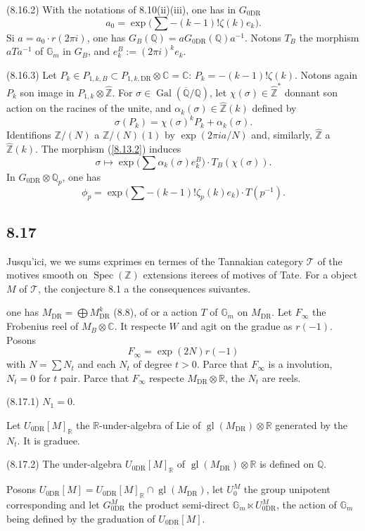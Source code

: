 \documentclass[12pt,a4paper]{article}
\theoremstyle{plain}
\theoremstyle{definition}
\theoremstyle{remark}
\DeclareMathOperator{\Spec}{Spec}
\DeclareMathOperator{\Gal}{Gal}
\DeclareMathOperator{\gl}{gl}
\newcommand{\Gm}{\mathbb{G}_m}
\newcommand{\Q}{\mathbb{Q}}
\newcommand{\Z}{\mathbb{Z}}
\newcommand{\C}{\mathbb{C}}
\newcommand{\R}{\mathbb{R}}
\newcommand{\DR}{\mathrm{DR}}
\begin{document}
(8.16.2) With the notations of 8.10(ii)(iii), one has in $G_{0\DR}$
$$a_0 = \exp\Big(\sum -(k-1)!\zeta(k) e_k\Big).$$
Si $a = a_0 \cdot r(2\pi i)$, one has $G_B(\Q) = a G_{0\DR}(\Q) a^{-1}$. Notons $T_B$ the morphism $aTa^{-1}$ of $\Gm$ in $G_B$, and $e_k^B := (2\pi i)^k e_k$.

(8.16.3) Let $P_k \in P_{1,k,B} \subset P_{1,k,\DR} \otimes \C = \C$: $P_k = -(k-1)!\zeta(k)$. Notons again $P_k$ son image in $P_{1,k} \otimes \hat{\Z}$. For $\sigma \in \Gal(\overline{\Q}/\Q)$, let $\chi(\sigma) \in \hat{\Z}^*$ donnant son action on the racines of the unite, and $\alpha_k(\sigma) \in \hat{\Z}(k)$ defined by
$$\sigma(P_k) = \chi(\sigma)^k P_k + \alpha_k(\sigma).$$
Identifions $\Z/(N)$ a $\Z/(N)(1)$ by $\exp(2\pi i a/N)$ and, similarly, $\hat{\Z}$ a $\hat{\Z}(k)$. The morphism (\ref{8.13.2}) induces
\begin{equation}\label{8.16.4}
\sigma \longmapsto \exp\Big(\sum \alpha_k(\sigma) e_k^B\Big) \cdot T_B(\chi(\sigma)). \tag{8.16.4}
\end{equation}
In $G_{0\DR} \otimes \Q_p$, one has
$$\phi_p = \exp\Big(\sum -(k-1)!\zeta_p(k) e_k\Big) \cdot T(p^{-1}).$$

\subsection*{8.17}

Jusqu'ici, we we sums exprimes en termes of the Tannakian category $\mathcal{T}$ of the motives smooth on $\Spec(\Z)$ extensions iterees of motives of Tate. For a object $M$ of $\mathcal{T}$, the conjecture 8.1 a the consequences suivantes.

one has $M_{\DR} = \bigoplus M_{\DR}^k$ (8.8), of or a action $T$ of $\Gm$ on $M_{\DR}$. Let $F_\infty$ the Frobenius reel of $M_B \otimes \C$. It respecte $W$ and agit on the gradue as $r(-1)$. Posons
$$F_\infty = \exp(2N)r(-1)$$
with $N = \sum N_t$ and each $N_t$ of degree $t > 0$. Parce that $F_\infty$ is a involution, $N_t = 0$ for $t$ pair. Parce that $F_\infty$ respecte $M_{\DR} \otimes \R$, the $N_t$ are reels.

(8.17.1) $N_1 = 0$.

Let $U_{0\DR}[M]_\R$ the $\R$-under-algebra of Lie of $\gl(M_{\DR}) \otimes \R$ generated by the $N_t$. It is graduee.

(8.17.2) The under-algebra $U_{0\DR}[M]_\R$ of $\gl(M_{\DR}) \otimes \R$ is defined on $\Q$.

Posons $U_{0\DR}[M] = U_{0\DR}[M]_\R \cap \gl(M_{\DR})$, let $U_0^M$ the group unipotent corresponding and let $G_{0\DR}^M$ the product semi-direct $\Gm \ltimes U_{0\DR}^M$, the action of $\Gm$ being defined by the graduation of $U_{0\DR}[M]$.
\end{document}
